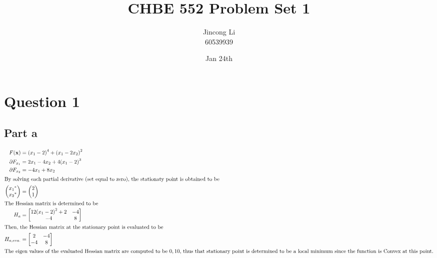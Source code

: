 \documentclass[a4paper,12pt]{article} %
\begin{document}
\newcommand{\vect}[1]{\mathbf{#1}}

\title{CHBE 552 Problem Set 1}
\author{Jincong Li \\ 60539939}
\date{Jan 24th}
\maketitle

\section{\textbf{Question 1}}

\subsection{Part a}

\begin{align*}
F( \vect{x} )  &= {(x_1 - 2)}^4 + {(x_1-2x_2)}^2 \\
\partial F_{x_1} &= 2 x_{1} - 4 x_{2} + 4 {\left(x_{1} - 2\right)}^{3} \\
\partial F_{x_2} &= -4x_1 + 8x_2\\
\intertext{By solving each partial derivative (set equal to zero), the stationaty point is obtained to be}
\begin{pmatrix} 
{x_1}^* \\ {x_2}^* 
\end{pmatrix}
&= 
\begin{pmatrix} 
2\\1
\end{pmatrix}
\\
\intertext{The Hessian matrix is determined to be}
H_a &= \left[\begin{matrix}12 {\left(x_{1} - 2\right)}^{2} + 2 & -4\\-4 & 8\end{matrix}\right]\\
\intertext{Then, the Hessian matrix at the stationary point is evaluated to be}
H_{a,eva.}&=\left[\begin{matrix}2 & -4\\-4 & 8\end{matrix}\right]\\
\intertext{The eigen values of the evaluated Hessian matrix are computed to be $0, 10$, thus that stationary point is determined to be a local minimum since the function is Convex at this point.}
\end{align*}
\end{document}
